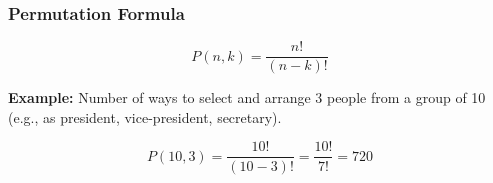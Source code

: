 \documentclass[12pt]{beamer}
\begin{document}
		\begin{frame}
			\frametitle{Permutation Formula}
			
			\begin{equation*}
				P(n,k) = \frac{n!}{(n-k)!}
			\end{equation*}
			
			\vspace{0.5cm}
			
			\textbf{Example:} Number of ways to select and arrange 3 people from a group of 10 (e.g., as president, vice-president, secretary).
			
			\begin{equation*}
				P(10,3) = \frac{10!}{(10-3)!} = \frac{10!}{7!} = 720
			\end{equation*}
			
		\end{frame}
		
\end{document}
